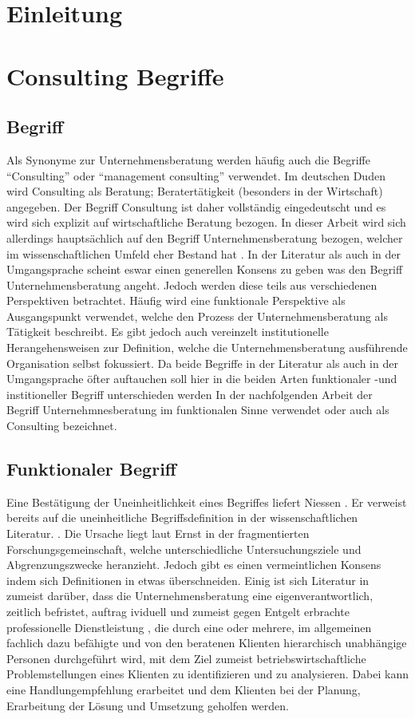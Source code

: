 \chapter{Einleitung}
\chapter{Consulting Begriffe}
\section{Begriff}
Als Synonyme zur Unternehmensberatung werden häufig auch die Begriffe “Consulting”
oder “management consulting” verwendet. Im deutschen Duden wird Consulting als Beratung; Beratertätigkeit (besonders in der Wirtschaft) angegeben. Der Begriff Consultung ist daher vollständig eingedeutscht und es wird sich explizit auf wirtschaftliche Beratung bezogen. 
In dieser Arbeit wird sich allerdings hauptsächlich auf den Begriff Unternehmensberatung bezogen, welcher im wissenschaftlichen Umfeld eher Bestand hat .
In der Literatur als auch in der Umgangsprache scheint eswar einen generellen Konsens zu geben was den Begriff Unternehmensberatung angeht. 
Jedoch werden diese teils aus verschiedenen Perspektiven betrachtet. Häufig wird eine funktionale Perspektive als Ausgangspunkt verwendet, welche den Prozess der Unternehmensberatung als Tätigkeit beschreibt. Es gibt jedoch auch vereinzelt institutionelle Herangehensweisen zur Definition, welche die Unternehmensberatung ausführende Organisation selbst fokussiert. Da beide Begriffe in der Literatur als auch in der Umgangsprache öfter auftauchen soll hier in die beiden Arten funktionaler -und institioneller Begriff unterschieden werden In der nachfolgenden Arbeit der Begriff Unternehmnesberatung im funktionalen Sinne verwendet oder auch als Consulting bezeichnet.

\section{Funktionaler Begriff}

Eine Bestätigung der Uneinheitlichkeit eines Begriffes liefert Niessen \cite[10]{nissen2007consulting}. Er verweist bereits auf die uneinheitliche Begriffsdefinition in der wissenschaftlichen Literatur. \cite[7]{ernst2002evaluation}. Die Ursache liegt laut Ernst \cite[10]{ernst2002evaluation} in der fragmentierten Forschungsgemeinschaft, welche unterschiedliche Untersuchungsziele und Abgrenzungszwecke heranzieht. 
Jedoch gibt es einen vermeintlichen Konsens indem sich Definitionen in etwas überschneiden. Einig ist sich Literatur in  zumeist darüber, dass die Unternehmensberatung eine eigenverantwortlich, zeitlich befristet, auftrag
ividuell und zumeist gegen Entgelt erbrachte professionelle Dienstleistung \cite[14]{Lippold201309}, die durch eine oder mehrere, im allgemeinen fachlich dazu befähigte und von den beratenen Klienten hierarchisch unabhängige Personen durchgeführt wird, mit dem Ziel zumeist betriebswirtschaftliche Problemstellungen eines Klienten zu identifizieren und zu analysieren. Dabei kann eine Handlungempfehlung erarbeitet und dem Klienten bei der Planung, Erarbeitung der Lösung und Umsetzung geholfen werden.  \cite[15]{nissen2007consulting}

